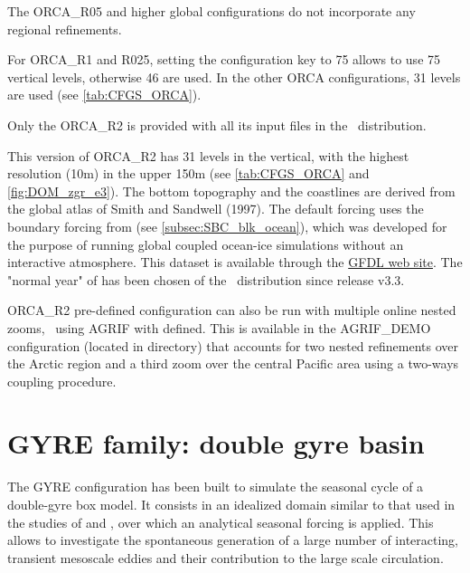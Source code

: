 \documentclass[../main/NEMO_manual]{subfiles}
\begin{document}
The ORCA\_R05 and higher global configurations do not incorporate any regional refinements.

For ORCA\_R1 and R025, setting the configuration key to 75 allows to use 75 vertical levels, otherwise 46 are used.
In the other ORCA configurations, 31 levels are used
(see \autoref{tab:CFGS_ORCA}). %

Only the ORCA\_R2 is provided with all its input files in the \NEMO\ distribution.

This version of ORCA\_R2 has 31 levels in the vertical, with the highest resolution (10m) in the upper 150m
(see \autoref{tab:CFGS_ORCA} and \autoref{fig:DOM_zgr_e3}).
The bottom topography and the coastlines are derived from the global atlas of Smith and Sandwell (1997).
The default forcing uses the boundary forcing from \citet{large.yeager_trpt04} (see \autoref{subsec:SBC_blk_ocean}),
which was developed for the purpose of running global coupled ocean-ice simulations without
an interactive atmosphere.
This \citet{large.yeager_trpt04} dataset is available through
the \href{http://nomads.gfdl.noaa.gov/nomads/forms/mom4/CORE.html}{GFDL web site}.
The "normal year" of \citet{large.yeager_trpt04} has been chosen of the \NEMO\ distribution since release v3.3.

ORCA\_R2 pre-defined configuration can also be run with multiple online nested zooms, \ie\ using AGRIF with  defined.
This is available in the AGRIF\_DEMO configuration (located in  directory) that
accounts for two nested refinements over the Arctic region and a third zoom over the central Pacific area 
using a two-ways coupling procedure.

\section{GYRE family: double gyre basin}
\label{sec:CFGS_gyre}

The GYRE configuration \citep{levy.klein.ea_OM10} has been built to
simulate the seasonal cycle of a double-gyre box model.
It consists in an idealized domain similar to that used in the studies of \citet{drijfhout_JPO94} and
\citet{hazeleger.drijfhout_JPO98, hazeleger.drijfhout_JPO99, hazeleger.drijfhout_JGR00, hazeleger.drijfhout_JPO00},
over which an analytical seasonal forcing is applied.
This allows to investigate the spontaneous generation of a large number of interacting, transient mesoscale eddies
and their contribution to the large scale circulation.
\end{document}
